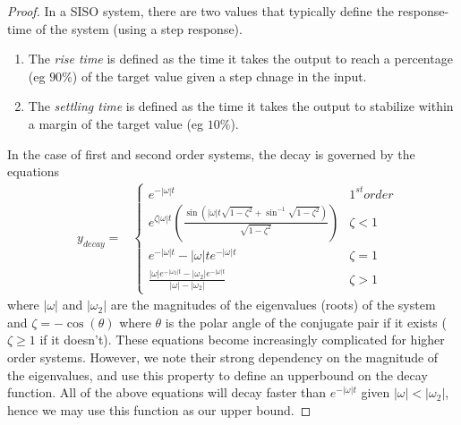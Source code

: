 \documentclass[sigconf]{llncs}
\begin{document}
\begin{proof}
In a SISO system, there are two values that typically define the
response-time of the system (using a step response).
%
\begin{enumerate}
\item The \emph{rise time} is defined as the time it takes the output to reach a percentage (eg $90\%$) of the target value given a step chnage in the input.
\item The \emph{settling time} is defined as the time it takes the output to stabilize within a margin of the target value (eg $10\%$).
\end{enumerate} 
%
In the case of first and second order systems, the decay is governed by the equations 
%
\begin{align*}
&y_{decay}=
&\left\{
\begin{array}{cc}
e^{-|\omega| t}& 1^{st} order\\
e^{\zeta |\omega| t}\left(\frac{\sin\left(|\omega| t\sqrt{1-\zeta^2}+\sin^{-1}\sqrt{1-\zeta^2}\right)}{\sqrt{1-\zeta^2}} \right)&\zeta<1\\
e^{-|\omega| t}-|\omega| t e^{-|\omega| t}&\zeta=1\\
\frac{|\omega| e^{-|\omega_2| t}-|\omega_2| e^{-|\omega| t}}{|\omega|-|\omega_2|}&\zeta>1\end{array}\right.
\end{align*}
where $|\omega|$ and $|\omega_2|$ are the magnitudes of the eigenvalues (roots) of the system and  $\zeta=-\cos(\theta)$ where $\theta$ is the polar angle of the conjugate pair if it exists ($\zeta \geq 1$ if it doesn't).
These equations become increasingly complicated for higher order systems. However, we note their strong dependency on the magnitude of the eigenvalues, and use this property to define an upperbound on the decay function.
All of the above equations will decay faster than $e^{-|\omega| t}$ given $|\omega| < |\omega_2|$, hence we may use this function as our upper bound.


\end{proof}
\end{document}
